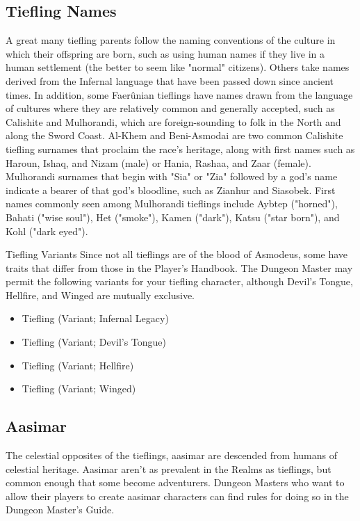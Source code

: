 \documentclass[10pt,a4paper,twoside,twocolumn,openany,bg=print,nodeprecatedcode]{dndbook}
\begin{document}
\subsection{Tiefling Names}
A great many tiefling parents follow the naming conventions of the culture in which their offspring are born, such as using human names if they live in a human settlement (the better to seem like "normal" citizens). Others take names derived from the Infernal language that have been passed down since ancient times.
In addition, some Faerûnian tieflings have names drawn from the language of cultures where they are relatively common and generally accepted, such as Calishite and Mulhorandi, which are foreign-sounding to folk in the North and along the Sword Coast.
Al-Khem and Beni-Asmodai are two common Calishite tiefling surnames that proclaim the race's heritage, along with first names such as Haroun, Ishaq, and Nizam (male) or Hania, Rashaa, and Zaar (female).
Mulhorandi surnames that begin with "Sia" or "Zia" followed by a god's name indicate a bearer of that god's bloodline, such as Zianhur and Siasobek. First names commonly seen among Mulhorandi tieflings include Aybtep ("horned"), Bahati ("wise soul"), Het ("smoke"), Kamen ("dark"), Katsu ("star born"), and Kohl ("dark eyed").
\begin{DndComment}{Tiefling Variants}
Since not all tieflings are of the blood of Asmodeus, some have traits that differ from those in the Player's Handbook. The Dungeon Master may permit the following variants for your tiefling character, although Devil's Tongue, Hellfire, and Winged are mutually exclusive.

\begin{itemize}
\item Tiefling (Variant; Infernal Legacy)
\item Tiefling (Variant; Devil's Tongue)
\item Tiefling (Variant; Hellfire)
\item Tiefling (Variant; Winged)
\end{itemize}

\end{DndComment}

\subsection{Aasimar}
The celestial opposites of the tieflings, aasimar are descended from humans of celestial heritage. Aasimar aren't as prevalent in the Realms as tieflings, but common enough that some become adventurers. Dungeon Masters who want to allow their players to create aasimar characters can find rules for doing so in the Dungeon Master's Guide.
\end{document}
